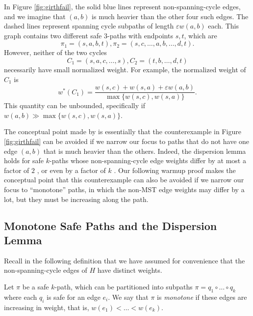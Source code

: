 \documentclass{theoretics}
\newcommand{\eps}{\varepsilon}
\begin{document}
In Figure \ref{fig:girthfail}, the solid blue lines represent non-spanning-cycle edges, and we imagine that $(a, b)$ is much heavier than the other four such edges.
The dashed lines represent spanning cycle subpaths of length $\eps w(a, b)$ each.  This graph contains two different safe $3$-paths with endpoints $s, t$, which are
$$\pi_1 = (s, a, b, t), \pi_2 = (s, c, \dots, a, b, \dots, d, t).$$
However, neither of the two cycles
$$C_1 = (s, a, c, \dots, s), C_2 = (t, b, \dots, d, t)$$
necessarily have small normalized weight.
For example, the normalized weight of $C_1$ is
$$w^*(C_1) = \frac{w(s, c) + w(s, a) + \eps w(a, b)}{\max\{w(s, c), w(s, a)\}}.$$
This quantity can be unbounded, specifically if $w(a, b) \gg \max\{w(s, c), w(s, a)\}$.


The conceptual point made by \cite{CDNS95, ENS15} is essentially that the counterexample in Figure \ref{fig:girthfail} can be avoided if we narrow our focus to paths that do not have one edge $(a, b)$ that is much heavier than the others.
Indeed, the dispersion lemma holds for safe $k$-paths whose non-spanning-cycle edge weights differ by at most a factor of $2$ \cite{CDNS95}, or even by a factor of $k$ \cite{ENS15}.
Our following warmup proof makes the conceptual point that this counterexample can also be avoided if we narrow our focus to ``monotone'' paths, in which the non-MST edge weights may differ by a lot, but they must be increasing along the path.

\subsection{Monotone Safe Paths and the Dispersion Lemma}

Recall in the following definition that we have assumed for convenience that the non-spanning-cycle edges of $H$ have distinct weights.

\begin{definition} 
Let $\pi$ be a safe $k$-path, which can be partitioned into subpaths
$\pi = q_1 \circ \dots \circ q_k$
where each $q_i$ is safe for an edge $e_i$.
We say that $\pi$ is \emph{monotone} if these edges are increasing in weight, that is, $w(e_1) < \dots < w(e_k)$.
\end{definition}

\end{document}
